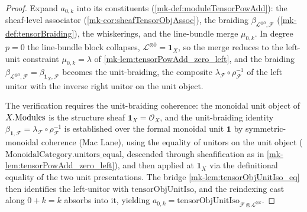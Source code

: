 \begin{proof}
  \leanok
    Expand \(a_{0,k}\) into its constituents (\ref{mk-def:moduleTensorPowAdd}): the
  sheaf-level associator (\ref{mk-cor:sheafTensorObjAssoc}), the braiding
  \(\beta_{\mathcal{L}^{\otimes 0},\mathcal{F}}\) (\ref{mk-def:tensorBraiding}), the
  whiskerings, and the line-bundle merge \(\mu_{0,k}\). In degree \(p=0\) the
  line-bundle block collapses, \(\mathcal{L}^{\otimes 0}=\mathbf{1}_X\), so the merge
  reduces to the left-unit constraint \(\mu_{0,k}=\lambda\) of
  \ref{mk-lem:tensorPowAdd_zero_left}, and the braiding
  \(\beta_{\mathcal{L}^{\otimes 0},\mathcal{F}}=\beta_{\mathbf{1}_X,\mathcal{F}}\)
  becomes the unit-braiding, the composite \(\lambda_{\mathcal{F}} \circ
  \rho_{\mathcal{F}}^{-1}\) of the left unitor with the inverse right unitor on the
  unit object.

  The verification requires the unit-braiding coherence: the monoidal unit object of
  \(X.\mathrm{Modules}\) is the structure sheaf \(\mathbf{1}_X = \mathcal{O}_X\), and the
  unit-braiding identity \(\beta_{\mathbf{1},\mathcal{F}} = \lambda_{\mathcal{F}} \circ
  \rho_{\mathcal{F}}^{-1}\) is established over the formal monoidal unit \(\mathbf{1}\)
  by symmetric-monoidal coherence (Mac Lane), using the equality of unitors on the
  unit object (\(\mathrm{MonoidalCategory.unitors\_equal}\), descended through
  sheafification as in \ref{mk-lem:tensorPowAdd_zero_left}), and then applied at
  \(\mathbf{1}_X\) via the definitional equality of the two unit presentations.
  The bridge \ref{mk-lem:tensorObjUnitIso_eq} then identifies the left-unitor with
  \(\mathrm{tensorObjUnitIso}\), and the reindexing cast along \(0+k=k\) absorbs
  into it, yielding
  \(a_{0,k}=\mathrm{tensorObjUnitIso}_{\mathcal{F}\otimes\mathcal{L}^{\otimes k}}\).
\end{proof}

